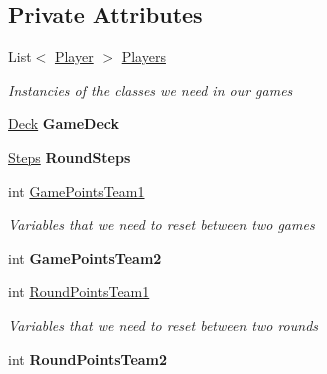 \subsection*{Private Attributes}
\begin{DoxyCompactItemize}
\item 
List$<$ \hyperlink{class_coinche_1_1_player}{Player} $>$ \hyperlink{class_coinche_1_1_game_rules_a72cfd63abfed2e0b3fec5288927a4933}{Players}
\begin{DoxyCompactList}\small\item\em Instancies of the classes we need in our games \end{DoxyCompactList}\item 
\mbox{\label{class_coinche_1_1_game_rules_a61b8593274ca301cd7f227ba8b85d7eb}} 
\hyperlink{class_coinche_1_1_deck}{Deck} {\bfseries Game\+Deck}
\item 
\mbox{\label{class_coinche_1_1_game_rules_abcee1e9752d03676f7754fdca3f022ed}} 
\hyperlink{class_coinche_1_1_steps}{Steps} {\bfseries Round\+Steps}
\item 
int \hyperlink{class_coinche_1_1_game_rules_af9bbc3c65e1c8f1698b8bae37fd9d0c9}{Game\+Points\+Team1}
\begin{DoxyCompactList}\small\item\em Variables that we need to reset between two games \end{DoxyCompactList}\item 
\mbox{\label{class_coinche_1_1_game_rules_a8423eec267ff1da36218358f2fc80054}} 
int {\bfseries Game\+Points\+Team2}
\item 
int \hyperlink{class_coinche_1_1_game_rules_ad6de66a1c81a21e14ad8c91fdc785647}{Round\+Points\+Team1}
\begin{DoxyCompactList}\small\item\em Variables that we need to reset between two rounds \end{DoxyCompactList}\item 
\mbox{\label{class_coinche_1_1_game_rules_a10c081a06cb59f57e73add2053b469ee}} 
int {\bfseries Round\+Points\+Team2}
\item 
\mbox{\label{class_coinche_1_1_game_rules_a534d7ccfc552dc305de4ff79797a6c8a}} 

\end{DoxyCompactItemize}
